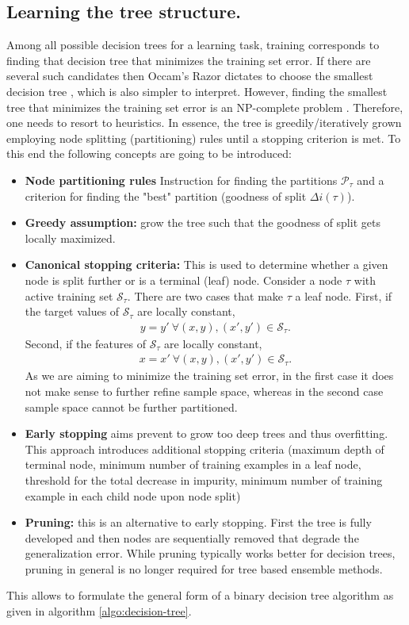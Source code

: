 \documentclass[12pt,a4paper]{article}
\begin{document}
\subsection{Learning the tree structure.}
Among all possible decision trees for a learning task, training corresponds to finding that decision tree that minimizes the training set error. If there are several such candidates then Occam's Razor dictates to choose the smallest decision tree \cite{BLUMER1987377}, which is also simpler to interpret. However, finding the smallest tree that minimizes the training set error is an NP-complete problem \cite{HYAFIL197615}. Therefore, one needs to resort to heuristics. In essence, the tree is greedily/iteratively grown employing node splitting (partitioning) rules until a stopping criterion is met. To this end the following concepts are going to be introduced:
\begin{itemize}\itemsep0em 
	\item \textbf{Node partitioning rules} Instruction for finding the partitions $\mathcal P_\tau$ and a criterion for finding the "best" partition (goodness of split $\Delta i(\tau)$).
	\item \textbf{Greedy assumption:} grow the tree such that the goodness of split gets locally maximized.
	\item \textbf{Canonical stopping criteria:} This is used to determine whether a given node is split further or is a terminal (leaf) node. Consider a  node $\tau$ with active training set $\mathcal S_\tau$.  There are two cases that make $\tau$ a leaf node. First, if the target values of $\mathcal S_\tau$ are locally constant,
	\begin{align}
		y = y' ~  \forall (x,y), (x',y') \in  \mathcal S_\tau.
	\end{align}
	Second, if the features of $\mathcal S_\tau$ are locally constant,
	\begin{align}
	x = x' ~  \forall (x,y), (x',y') \in  \mathcal S_\tau.
	\end{align}
	As we are aiming to minimize the training set error, in the first case it does not make sense to further refine sample space, whereas in the second case sample space cannot be further partitioned.
	\item \textbf{Early stopping} aims prevent to grow too deep trees and thus overfitting. This approach introduces additional stopping criteria (maximum depth of terminal node, minimum number of training examples in a leaf node, threshold for the total decrease in impurity, minimum number of training example in each child node upon node split)
	\item \textbf{Pruning:} this is an alternative to early stopping. First the tree is fully developed and then nodes are sequentially removed that degrade the generalization error. While pruning typically works better for decision  trees, pruning in general is no longer required for tree based ensemble methods. 
\end{itemize}
This allows to formulate the general form of a binary decision tree algorithm as given in algorithm \ref{algo:decision-tree}.
\end{document}
